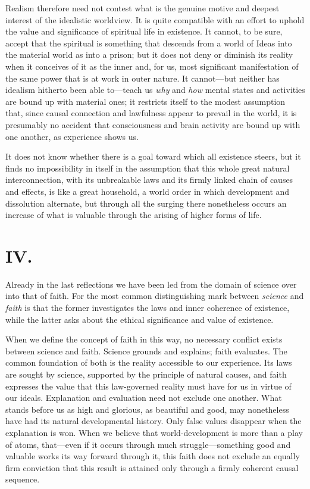 \documentclass[12pt,a4paper]{article}
\newcommand{\opage}[1]{\marginnote{\footnotesize\textit{[#1]}}}
\begin{document}
Realism therefore need not contest what is the genuine motive and deepest
interest of the idealistic worldview. It is quite compatible with an
effort to uphold the value and significance of spiritual life in existence.
It cannot, to be sure, accept that the spiritual is something that descends
from a world of Ideas into the material world as into a prison; but it
does not deny or diminish its reality when it conceives of it as the inner
and, for us, most significant manifestation of the same power that is at
work in outer nature. It cannot---but neither has idealism hitherto been
able to---teach us \emph{why} and \emph{how} mental states and activities are bound up
with material ones; it restricts itself to the modest assumption that,
since causal connection and lawfulness appear to prevail in the world, it
is presumably no accident that consciousness and brain activity are bound
up with one another, as experience shows us.

\opage{10}It does not know whether there is a goal toward which all existence steers,
but it finds no impossibility in itself in the assumption that this whole
great natural interconnection, with its unbreakable laws and its firmly
linked chain of causes and effects, is like a great household, a world
order in which development and dissolution alternate, but through all the
surging there nonetheless occurs an increase of what is valuable through
the arising of higher forms of life.

\section*{IV.}

Already in the last reflections we have been led from the domain of science
over into that of faith. For the most common distinguishing mark between \emph{science} and \emph{faith} is that the former investigates the laws and inner
coherence of existence, while the latter asks about the ethical
significance and value of existence.

When we define the concept of faith in this way, no necessary conflict
exists between science and faith. Science grounds and explains; faith
evaluates. The common foundation of both is the reality accessible to our
experience. Its laws are sought by science, supported by the principle of
natural causes, and faith expresses the value that this law-governed
reality must have for us in virtue of our ideals. Explanation and
evaluation need not exclude one another. What stands before us as high and
glorious, as beautiful and good, may nonetheless have had its natural
developmental history. Only false values disappear when the explanation
is won. When we believe that world-development is more than a play of
atoms, that---even if it occurs through much struggle---something good and
valuable works its way forward through it, this faith does not exclude an
equally firm conviction that this result is attained only through a firmly
coherent causal sequence.
\end{document}
